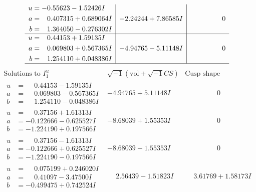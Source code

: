 \documentclass[1p]{elsarticle_modified}
\theoremstyle{definition}
\newcommand{\I}{\sqrt{-1}}
\begin{document}
$$\begin{array}{c|c|c}
\begin{aligned}
u &= -0.55623 - 1.52426 I \\
a &= \phantom{-}0.407315 + 0.689064 I \\
b &= \phantom{-}1.364050 - 0.276302 I\end{aligned}
 & -2.24244 + 7.86585 I & \phantom{-0.000000 } 0 \\ \hline\begin{aligned}
u &= \phantom{-}0.44153 + 1.59135 I \\
a &= \phantom{-}0.069803 + 0.567365 I \\
b &= \phantom{-}1.254110 + 0.048386 I\end{aligned}
 & -4.94765 - 5.11148 I & \phantom{-0.000000 } 0\\
 \hline 
 \end{array}$$\newpage$$\begin{array}{c|c|c}  
\text{Solutions to }I^u_{1}& \I (\text{vol} + \sqrt{-1}CS) & \text{Cusp shape}\\
 \hline 
\begin{aligned}
u &= \phantom{-}0.44153 - 1.59135 I \\
a &= \phantom{-}0.069803 - 0.567365 I \\
b &= \phantom{-}1.254110 - 0.048386 I\end{aligned}
 & -4.94765 + 5.11148 I & \phantom{-0.000000 } 0 \\ \hline\begin{aligned}
u &= \phantom{-}0.37156 + 1.61313 I \\
a &= -0.122666 - 0.625527 I \\
b &= -1.224190 + 0.197566 I\end{aligned}
 & -8.68039 + 1.55353 I & \phantom{-0.000000 } 0 \\ \hline\begin{aligned}
u &= \phantom{-}0.37156 - 1.61313 I \\
a &= -0.122666 + 0.625527 I \\
b &= -1.224190 - 0.197566 I\end{aligned}
 & -8.68039 - 1.55353 I & \phantom{-0.000000 } 0 \\ \hline\begin{aligned}
u &= \phantom{-}0.075199 + 0.246020 I \\
a &= \phantom{-}0.41097 - 3.47500 I \\
b &= -0.499475 + 0.742524 I\end{aligned}
 & \phantom{-}2.56439 - 1.51823 I & \phantom{-}3.61769 + 1.58173 I \\ \hline\begin{aligned}

\end{aligned}
\end{array}$$
\end{document}
